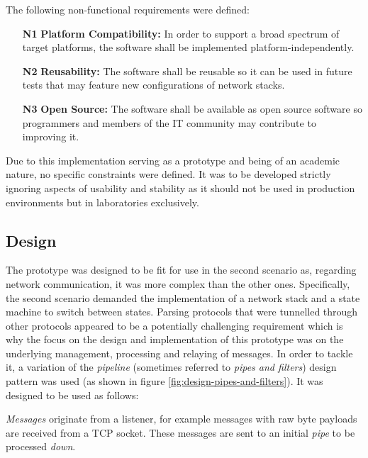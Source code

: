 The following non-functional requirements were defined:

\begin{itemize}
    \item [\textbf{N1}] \textbf{Platform Compatibility:} In order to support a broad spectrum of target platforms, the software shall be implemented platform-independently.
    \item [\textbf{N2}] \textbf{Reusability:} The software shall be reusable so it can be used in future tests that may feature new configurations of network stacks.
    \item [\textbf{N3}] \textbf{Open Source:} The software shall be available as open source software so programmers and members of the IT community may contribute to improving it.
\end{itemize}

Due to this implementation serving as a prototype and being of an academic nature, no specific constraints were defined. It was to be developed strictly ignoring aspects of usability and stability as it should not be used in production environments but in laboratories exclusively.

\subsection{Design}
\label{sec:prototype-design}
The prototype was designed to be fit for use in the second scenario as, regarding network communication, it was more complex than the other ones. Specifically, the second scenario demanded the implementation of a network stack and a state machine to switch between states.
Parsing protocols that were tunnelled through other protocols appeared to be a potentially challenging requirement which is why the focus on the design and implementation of this prototype was on the underlying management, processing and relaying of messages. In order to tackle it, a variation of the \emph{pipeline} (sometimes referred to \emph{pipes and filters}) design pattern was used (as shown in figure \ref{fig:design-pipes-and-filters}). It was designed to be used as follows:\par
\emph{Messages} originate from a listener, for example messages with raw byte payloads are received from a \ac{TCP} socket. These messages are sent to an initial \emph{pipe} to be processed \emph{down}.


